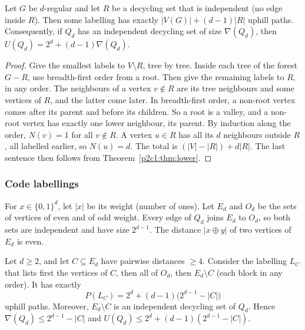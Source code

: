 \begin{proposition}\label{p2c1:prop:indep}
Let $G$ be $d$-regular and let $R$ be a decycling set that is independent (no edge inside
$R$). Then some labelling has exactly $|V(G)|+(d-1)|R|$ uphill paths. Consequently, if $Q_d$ has
an independent decycling set of size $\nabla(Q_d)$, then $U(Q_d)=2^d+(d-1)\nabla(Q_d)$.
\end{proposition}

\begin{proof}
Give the smallest labels to $V\setminus R$, tree by tree. Inside each tree of the forest
$G-R$, use breadth-first order from a root. Then give the remaining labels to $R$, in any order.
The neighbours of a vertex $v\notin R$ are its tree neighbours and some vertices of $R$, and the
latter come later. In breadth-first order, a non-root vertex comes after its parent and before its
children. So a root is a valley, and a non-root vertex has exactly one lower neighbour, its parent.
By induction along the order, $N(v)=1$ for all $v\notin R$. A vertex $u\in R$ has all its $d$
neighbours outside $R$, all labelled earlier, so $N(u)=d$. The total is
$(|V|-|R|)+d|R|$. The last sentence then follows from Theorem~\ref{p2c1:thm:lower}.
\end{proof}

\subsubsection{Code labellings}\label{p2c1:sec:code}

For $x\in\{0,1\}^d$, let $|x|$ be its weight (number of ones). Let $E_d$ and $O_d$ be the sets of
vertices of even and of odd weight. Every edge of $Q_d$ joins $E_d$ to $O_d$, so both sets are
independent and have size $2^{d-1}$. The distance $|x\oplus y|$ of two vertices of $E_d$ is even.

\begin{proposition}\label{p2c1:prop:code}
Let $d\ge2$, and let $C\subseteq E_d$ have pairwise distances $\ge4$. Consider the labelling $L_C$
that lists first the vertices of $C$, then all of $O_d$, then $E_d\setminus C$ (each block in any
order). It has exactly
\[
  P(L_C)=2^d+(d-1)\bigl(2^{d-1}-|C|\bigr)
\]
uphill paths. Moreover, $E_d\setminus C$ is an independent decycling set of $Q_d$. Hence
$\nabla(Q_d)\le2^{d-1}-|C|$ and $U(Q_d)\le2^d+(d-1)(2^{d-1}-|C|)$.
\end{proposition}

